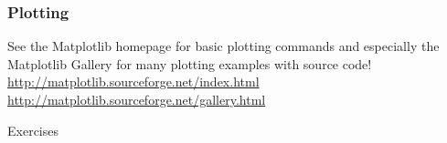 \begin{frame}
\frametitle{Plotting}
See the Matplotlib homepage for basic plotting commands and especially the
Matplotlib Gallery for many plotting examples with source code!\\
\href{http://matplotlib.sourceforge.net/index.html}{http://matplotlib.sourceforge.net/index.html}
\href{http://matplotlib.sourceforge.net/gallery.html}{http://matplotlib.sourceforge.net/gallery.html}
\end{frame}

\begin{frame}
\begin{center}
\Huge{Exercises}
\end{center}
\end{frame}

